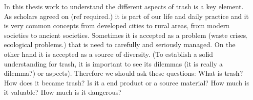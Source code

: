 In this thesis work to understand the different aspects of trash is a key element.  As scholars agreed on (ref required.) it is part of our life and daily practice and it is very common concepts from developed cities to rural areas, from modern societies to ancient societies. Sometimes it is accepted as a problem (waste crises, ecological problems.) that is need to carefully and seriously managed. On the other hand it is accepted as a source of diversity. (To establish a solid understanding for trash, it is important to see its dilemmas (it is really a dilemma?) or aspects). Therefore we should ask these questions: What is trash? How does it became trash? Is it a end product or a source material? How much is it valuable? How much is it dangerous?



